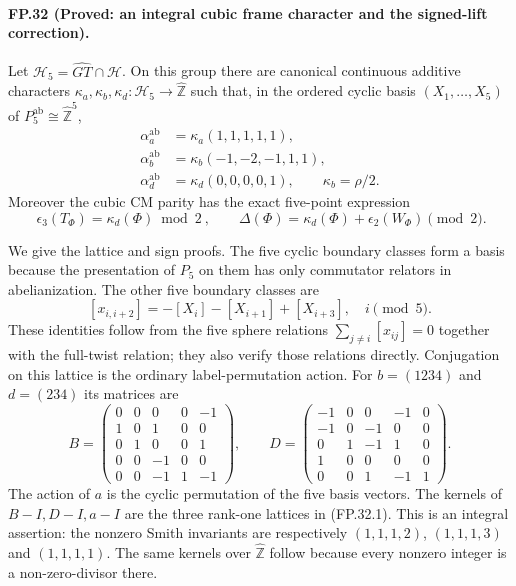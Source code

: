 \paragraph{FP.32 (Proved: an integral cubic frame character and the signed-lift correction).}
Let $\mathcal H_5=\widehat{GT}\cap\mathcal H$. On this group there
are canonical continuous additive characters
$\kappa_a,\kappa_b,\kappa_d:\mathcal H_5\to\widehat{\mathbb Z}$
such that, in the ordered cyclic basis $(X_1,\ldots,X_5)$ of
$P_5^{\mathrm{ab}}\cong\widehat{\mathbb Z}^{5}$,
\[
 \begin{split}
 \alpha_a^{\mathrm{ab}}&=\kappa_a(1,1,1,1,1),\\
 \alpha_b^{\mathrm{ab}}&=\kappa_b(-1,-2,-1,1,1),\\
 \alpha_d^{\mathrm{ab}}&=\kappa_d(0,0,0,0,1),\qquad
 \kappa_b=\rho/2.
 \end{split}
 \tag{FP.32.1}
\]
Moreover the cubic CM parity has the exact five-point expression
\[
 \boxed{\ \epsilon_3(T_\Phi)=\kappa_d(\Phi)\bmod2\ },
 \qquad
 \Delta(\Phi)=\kappa_d(\Phi)+\epsilon_2(W_\Phi)\pmod2.
 \tag{FP.32.2}
\]

We give the lattice and sign proofs. The five cyclic boundary classes
form a basis because the presentation of $P_5$ on them has only
commutator relators in abelianization. The other five boundary classes
are
\[
 [x_{i,i+2}]=-[X_i]-[X_{i+1}]+[X_{i+3}],
 \quad i\pmod5.
\]
These identities follow from the five sphere relations
$\sum_{j\ne i}[x_{ij}]=0$ together with the full-twist relation;
they also verify those relations directly. Conjugation on this lattice
is the ordinary label-permutation action. For $b=(1234)$ and
$d=(234)$ its matrices are
\[
 B=\begin{pmatrix}
 0&0&0&0&-1\\1&0&1&0&0\\0&1&0&0&1\\
 0&0&-1&0&0\\0&0&-1&1&-1
 \end{pmatrix},\qquad
 D=\begin{pmatrix}
 -1&0&0&-1&0\\-1&0&-1&0&0\\0&1&-1&1&0\\
 1&0&0&0&0\\0&0&1&-1&1
 \end{pmatrix}.
 \tag{FP.32.3}
\]
The action of $a$ is the cyclic permutation of the five basis vectors.
The kernels of $B-I,D-I,a-I$ are the three rank-one lattices in
(FP.32.1). This is an integral assertion: the nonzero Smith invariants
are respectively $(1,1,1,2)$, $(1,1,1,3)$ and $(1,1,1,1)$.
The same kernels over $\widehat{\mathbb Z}$ follow because every
nonzero integer is a non-zero-divisor there.

